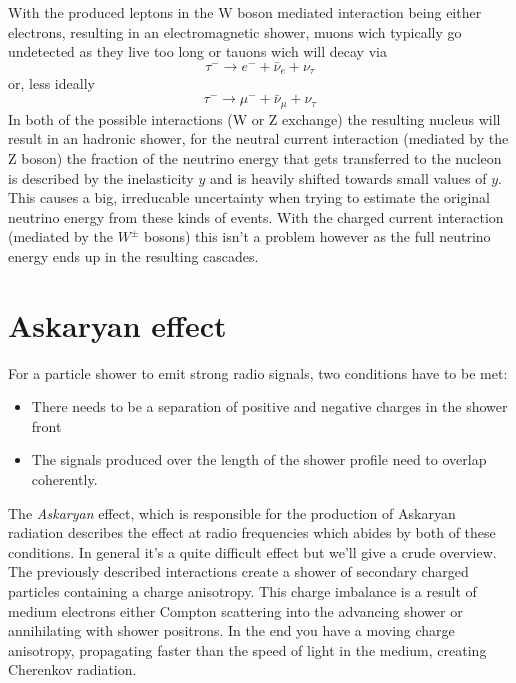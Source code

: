 \documentclass[11pt,a4paper,faculty=we,language=en,doctype=report]{cls/ugent-doc}
\begin{document}
With the produced leptons in the W boson mediated interaction being either electrons,
resulting in an electromagnetic shower, muons wich typically go undetected as they live
too long or
tauons wich will decay via
\begin{equation}
	\tau^- \rightarrow e^- + \bar{\nu}_e + \nu_\tau
\end{equation}
or, less ideally
\begin{equation}
	\tau^- \rightarrow \mu^- + \bar{\nu}_\mu + \nu_\tau
\end{equation}
In both of the possible interactions (W or Z exchange) the resulting nucleus
will result in an hadronic shower, for the neutral current interaction (mediated
by the Z boson) the fraction of the neutrino energy that gets transferred to
the nucleon is described by the inelasticity $y$ and is heavily shifted towards
small values of $y$\cite{elasticity_y}. This causes a big, irreducable
uncertainty when trying to estimate the original neutrino energy from these
kinds of events.  With the charged current interaction (mediated by the $W^\pm$
bosons) this isn't a problem however as the full neutrino energy ends up in the
resulting cascades.
\section{Askaryan effect}
For a particle shower to emit strong radio signals, two conditions have to be met:
\begin{itemize}
	\item There needs to be a separation of positive and negative charges in the shower front 
	\item The signals produced over the length of the shower profile need to overlap coherently.
\end{itemize}
The \textit{Askaryan} \cite{Askaryan} effect, which is responsible for the
production of Askaryan radiation describes the effect at radio frequencies
which abides by both of these conditions. 
In general it's a quite difficult effect but we'll give a crude overview.  The previously described interactions
create a shower of secondary charged particles containing a charge anisotropy.
This charge imbalance is a result of medium electrons either Compton scattering
into the advancing shower or annihilating with shower positrons.  In the end
you have a moving charge anisotropy, propagating faster than the speed of light
in the medium, creating Cherenkov radiation.  
\end{document}
